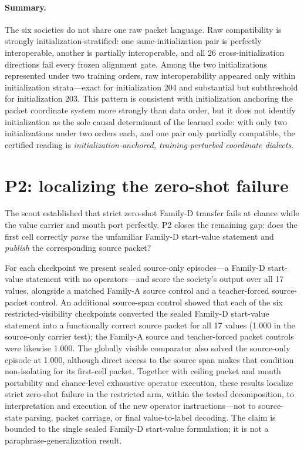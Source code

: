 \documentclass[11pt]{article}
\begin{document}
\paragraph{Summary.} The six societies do not share one raw packet language. Raw compatibility is strongly initialization-stratified: one same-initialization pair is perfectly interoperable, another is partially interoperable, and all 26 cross-initialization directions fail every frozen alignment gate. Among the two initializations represented under two training orders, raw interoperability appeared only within initialization strata---exact for initialization 204 and substantial but subthreshold for initialization 203. This pattern is consistent with initialization anchoring the packet coordinate system more strongly than data order, but it does not identify initialization as the sole causal determinant of the learned code: with only two initializations under two orders each, and one pair only partially compatible, the certified reading is \emph{initialization-anchored, training-perturbed coordinate dialects}.

\section{P2: localizing the zero-shot failure}\label{sec:p2}

The scout established that strict zero-shot Family-D transfer fails at chance while the value carrier and mouth port perfectly. P2 closes the remaining gap: does the first cell correctly \emph{parse} the unfamiliar Family-D start-value statement and \emph{publish} the corresponding source packet?

For each checkpoint we present sealed source-only episodes---a Family-D start-value statement with no operators---and score the society's output over all 17 values, alongside a matched Family-A source control and a teacher-forced source-packet control. An additional source-span control showed that each of the six restricted-visibility checkpoints converted the sealed Family-D start-value statement into a functionally correct source packet for all 17 values (1.000 in the source-only carrier test); the Family-A source and teacher-forced packet controls were likewise 1.000. The globally visible comparator also solved the source-only episode at 1.000, although direct access to the source span makes that condition non-isolating for its first-cell packet. Together with ceiling packet and mouth portability and chance-level exhaustive operator execution, these results localize strict zero-shot failure in the restricted arm, within the tested decomposition, to interpretation and execution of the new operator instructions---not to source-state parsing, packet carriage, or final value-to-label decoding. The claim is bounded to the single sealed Family-D start-value formulation; it is not a paraphrase-generalization result.
\end{document}
